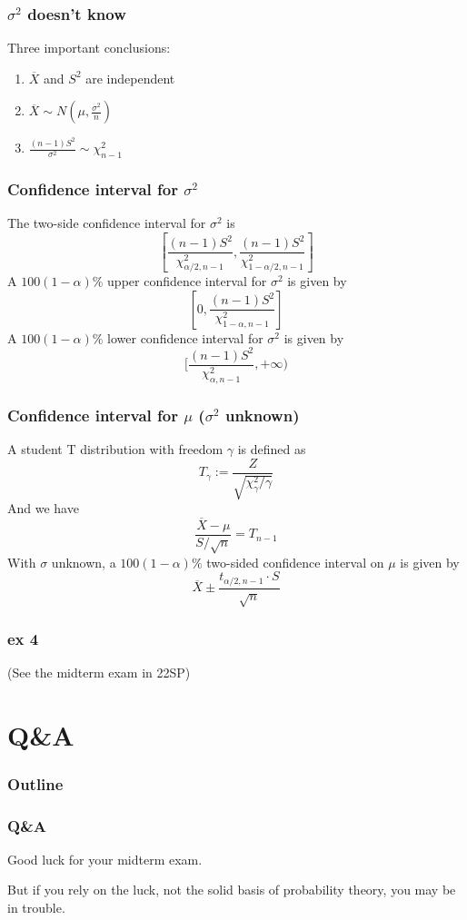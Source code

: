 \documentclass{beamer}
\begin{document}
\begin{frame}
    \frametitle{$\sigma^2$ doesn't know}
    Three important conclusions:
    \begin{enumerate}
        \item $\overline{X}$ and $S^2$ are independent
        \item $\overline{X}\sim N(\mu, \frac{\sigma^2}{n})$
        \item $\frac{(n-1)S^2}{\sigma^2}\sim \chi^2_{n-1}$
    \end{enumerate}
    

\end{frame}

\begin{frame}
    \frametitle{Confidence interval for $\sigma^2$}

    The two-side confidence interval for $\sigma^2$ is
    \[[\frac{(n-1)S^2}{\chi_{\alpha/2,n-1}^2},\frac{(n-1)S^2}{\chi_{1-\alpha/2,n-1}^2}]\]
    A $100(1-\alpha)\%$ upper confidence interval for $\sigma^2$ is given by
    \[[0,\frac{(n-1)S^2}{\chi_{1-\alpha,n-1}^2}]\]
    A $100(1-\alpha)\%$ lower confidence interval for $\sigma^2$ is given by
    \[[\frac{(n-1)S^2}{\chi_{\alpha,n-1}^2},+\infty)\]

\end{frame}
\begin{frame}
    \frametitle{Confidence interval for $\mu$ ($\sigma^2$ unknown)}
    A student T distribution with freedom $\gamma$ is defined as
    \[T_{\gamma}:=\frac{Z}{\sqrt{\chi^2_{\gamma}/\gamma}}\]
    And we have
    \[\frac{\overline{X}-\mu}{S/\sqrt{n}}=T_{n-1}\]
    With $\sigma$ unknown, a $100(1-\alpha)\%$ two-sided confidence interval on $\mu$ is given by\[
    \overline{X}\pm\frac{t_{\alpha/2,n-1}\cdot S}{\sqrt{n}}\]

\end{frame}

\begin{frame}
    \frametitle{ex 4}

    (See the midterm exam in 22SP)

\end{frame}

\section{Q\&A}
\begin{frame}
    \frametitle{Outline}
    \tableofcontents[currentsection]
\end{frame}
\begin{frame}
    \frametitle{Q\&A}
    Good luck for your midterm exam. \par
    \vspace{0.3cm}
    But if you rely on the luck, not the solid basis of probability theory, you may be in trouble.
    

\end{frame}
\end{document}
